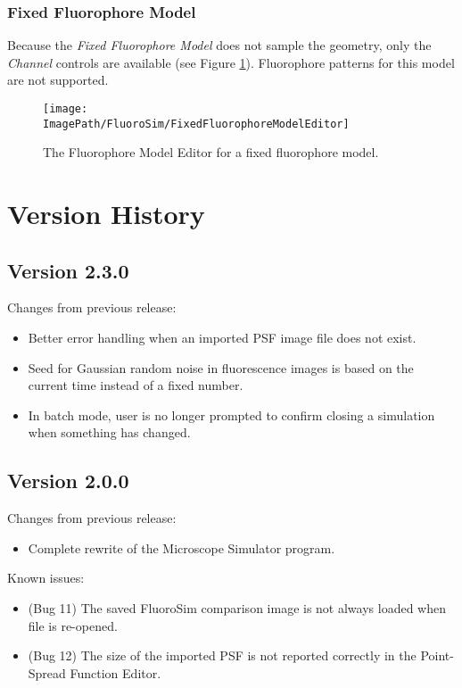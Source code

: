 \documentclass[11pt,titlepage,twoside]{article}
\begin{document}
\subsubsection{Fixed Fluorophore Model}

Because the \emph{Fixed Fluorophore Model} does not sample the geometry, only the \emph{Channel} controls are available (see Figure \ref{fig:FixedFluorophoreModelEditor}). Fluorophore patterns for this model are not supported.

\begin{figure}[htbp] %
   \centering
   \texttt{[image: \\ImagePath/FluoroSim/FixedFluorophoreModelEditor]} 
   \caption{The Fluorophore Model Editor for a fixed fluorophore model.}
   \label{fig:FixedFluorophoreModelEditor}
\end{figure}



\section{Version History}

\subsection{Version 2.3.0}

\noindent
Changes from previous release:
\begin{itemize}

\item Better error handling when an imported PSF image file does not exist.

\item Seed for Gaussian random noise in fluorescence images is based on the current time instead of a fixed number.

\item In batch mode, user is no longer prompted to confirm closing a simulation when something has changed.

\end{itemize}

\subsection{Version 2.0.0}

\noindent
Changes from previous release:
\begin{itemize}
\item Complete rewrite of the Microscope Simulator program.
\end{itemize}

\noindent
Known issues:
\begin{itemize}

\item (Bug 11) The saved FluoroSim comparison image is not always loaded when file is re-opened.

\item (Bug 12) The size of the imported PSF is not reported correctly in the Point-Spread Function Editor.

\end{itemize}
\end{document}

